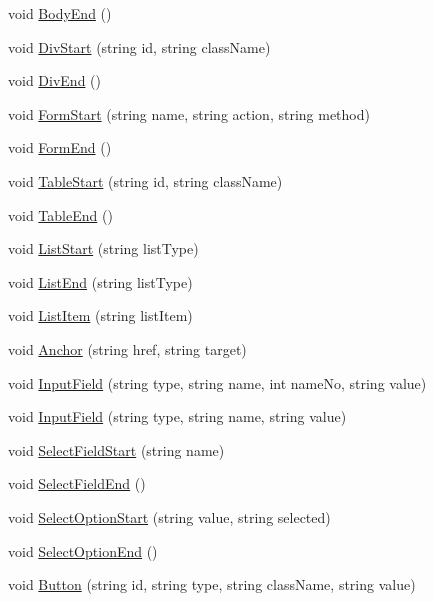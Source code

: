 \begin{DoxyCompactItemize}
\item 
void \hyperlink{classPageStructureMaker_ac91e234e2d54dedd9d7e556fabf21d2b}{Body\-End} ()
\item 
void \hyperlink{classPageStructureMaker_a927f92889555dd316c129f706be86a5c}{Div\-Start} (string id, string class\-Name)
\item 
void \hyperlink{classPageStructureMaker_a2913e76bf188ed777dcd33003ef6207d}{Div\-End} ()
\item 
void \hyperlink{classPageStructureMaker_a3f25d5b844a2251883acb80d8fabb77d}{Form\-Start} (string name, string action, string method)
\item 
void \hyperlink{classPageStructureMaker_a65d97f23bb543f3db5201b2009f7f65a}{Form\-End} ()
\item 
void \hyperlink{classPageStructureMaker_a04e68e69005f3933e0f496c3db474daf}{Table\-Start} (string id, string class\-Name)
\item 
void \hyperlink{classPageStructureMaker_a7f8fefbe7a825c1b7761fc8a0f1bb8e4}{Table\-End} ()
\item 
void \hyperlink{classPageStructureMaker_ac24ce26202757aaa30402155daf8a3d0}{List\-Start} (string list\-Type)
\item 
void \hyperlink{classPageStructureMaker_a8578b1555ad2fc92a9efc7dbf7d1fe87}{List\-End} (string list\-Type)
\item 
void \hyperlink{classPageStructureMaker_adf4116e526026edc3c8a3bcf96a7e929}{List\-Item} (string list\-Item)
\item 
void \hyperlink{classPageStructureMaker_a8c0fae5b599182863066de56ae0cea42}{Anchor} (string href, string target)
\item 
void \hyperlink{classPageStructureMaker_a3547027801e298307527f1e934787b13}{Input\-Field} (string type, string name, int name\-No, string value)
\item 
void \hyperlink{classPageStructureMaker_a928ea6f84a8f7833c128034068a4b9a7}{Input\-Field} (string type, string name, string value)
\item 
void \hyperlink{classPageStructureMaker_ae8684bb66ca463e2f92e09c96137f9e3}{Select\-Field\-Start} (string name)
\item 
void \hyperlink{classPageStructureMaker_a81eb3cdbc840a4c8165cef87330ade09}{Select\-Field\-End} ()
\item 
void \hyperlink{classPageStructureMaker_a77856078e74dab25329132ea07466f92}{Select\-Option\-Start} (string value, string selected)
\item 
void \hyperlink{classPageStructureMaker_a7682f479f7f1012d426ec9f9535def60}{Select\-Option\-End} ()
\item 
void \hyperlink{classPageStructureMaker_a419feca1cfdb50e1be757eb1c2707a73}{Button} (string id, string type, string class\-Name, string value)
\end{DoxyCompactItemize}
